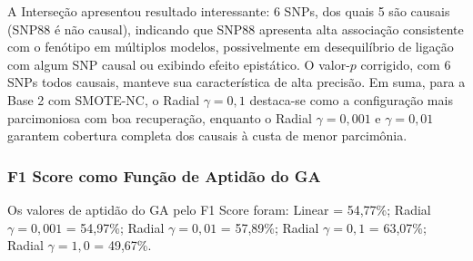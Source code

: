 \documentclass[12pt,a4paper]{article}
\newcommand{\novo}[1]{\textcolor{corNova}{#1}}
\begin{document}
\novo{A Interseção apresentou resultado interessante: 6 SNPs, dos quais 5 são causais (SNP88 é não causal), indicando que SNP88 apresenta alta associação consistente com o fenótipo em múltiplos modelos, possivelmente em desequilíbrio de ligação com algum SNP causal ou exibindo efeito epistático. O valor-$p$ corrigido, com 6 SNPs todos causais, manteve sua característica de alta precisão. Em suma, para a Base 2 com SMOTE-NC, o Radial $\gamma = 0{,}1$ destaca-se como a configuração mais parcimoniosa com boa recuperação, enquanto o Radial $\gamma = 0{,}001$ e $\gamma = 0{,}01$ garantem cobertura completa dos causais à custa de menor parcimônia.}

\subsubsection{\novo{F1 Score como Função de Aptidão do GA}}

\novo{Os valores de aptidão do GA pelo F1 Score foram: Linear = 54,77\%; Radial $\gamma{=}0{,}001$ = 54,97\%; Radial $\gamma{=}0{,}01$ = 57,89\%; Radial $\gamma{=}0{,}1$ = 63,07\%; Radial $\gamma{=}1{,}0$ = 49,67\%.}
\end{document}
